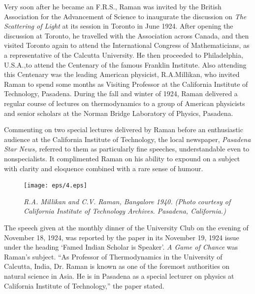 \noindent
Very soon after he became an F.R.S., Raman was invited
by the British Association for the Advancement of Science to
inaugurate the discussion on {\em The Scattering of Light} at its session
in Toronto in June 1924. After opening the discussion at Toronto,
he travelled with the Association across Canada, and then visited
Toronto again to attend the International Congress of
Mathematicians, as a representative of the Calcutta University.
He then proceeded to Philadelphia, U.S.A.,\break to attend the Centenary of the
 famous Franklin Institute. Also attending this
Centenary was the leading American physicist, R.A.\break Millikan,
who invited Raman to spend some months as Visiting Professor
at the California Institute of Technology, Pasadena. During the
fall and winter of 1924, Raman delivered a regular course of
lectures on thermodynamics to a group of American physicists
and senior scholars at the Norman Bridge Laboratory of Physics,
Pasadena.

Commenting on two special lectures delivered by Raman
before an enthusiastic audience at the California Institute of
Technology, the local newspaper, {\em Pasadena Star News,} referred
to them as particularly fine speeches, understandable even to
nonspecialists. It complimented Raman on his ability to expound
on a subject with clarity and eloquence combined with a rare sense
of humour.

\begin{figure}[t]
\centering
\texttt{[image: eps/4.eps]}

{\fontsize{10pt}{12pt}\selectfont\em R.A. Millikan and C.V. Raman, Bangalore 1940. (Photo courtesy of California Institute of Technology Archives. Pasadena, California.)}\relax
\end{figure}

The speech given at the monthly dinner of the University
Club on the evening of November 18, 1924, was reported by the
paper in its November 19, 1924 issue under the heading `Famed
Indian Scholar is Speaker'. \textit{A Game of Chance} was Raman's
subject. ``As Professor of Thermodynamics in the University of
Calcutta, India, Dr. Raman is known as one of the foremost
authorities on natural science in Asia. He is in Pasadena as a
special lecturer on physics at California Institute of Technology,''
the paper stated.


